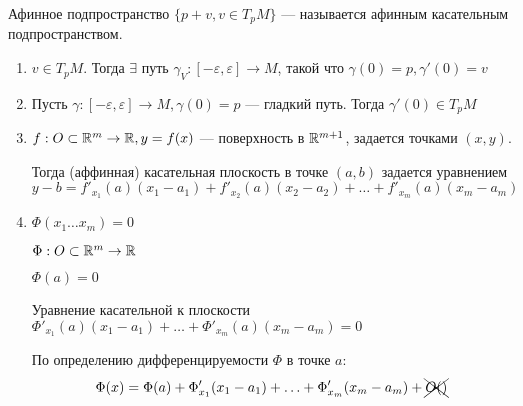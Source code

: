 \begin{example}
    Афинное подпространство $\{p + v, v\in T_pM\}$ --- называется афинным касательным подпространством.
\end{example}

\begin{remark}\itemfix
    \begin{enumerate}
        \item $v\in T_pM$. Тогда $\exists$ путь $\gamma_V : [-\varepsilon, \varepsilon] \to M$, такой что $\gamma(0)=p, \gamma'(0)=v$
        \item Пусть $\gamma : [-\varepsilon, \varepsilon]\to M, \gamma(0) = p$ --- гладкий путь. Тогда $\gamma'(0) \in T_pM$
        \item $f : O\subset\mathbb{R}^m \to\mathbb{R}, y=f(x)$ --- поверхность в $\mathbb{R}^{m+1}$, задается точками $(x, y)$.

              Тогда (аффинная) касательная плоскость в точке $(a, b)$ задается уравнением
              $$y-b = f'_{x_1}(a)(x_1-a_1) + f'_{x_2}(a)(x_2-a_2) + \ldots + f'_{x_m}(a)(x_m-a_m)$$
        \item $\Phi(x_1\ldots x_m) = 0$

              $\Phi : O\subset\mathbb{R}^m \to\mathbb{R}$

              $\Phi(a) = 0$

              Уравнение касательной к плоскости $\Phi'_{x_1}(a)(x_1-a_1) + \ldots + \Phi'_{x_m}(a)(x_m-a_m) = 0$


              По определению дифференцируемости $\Phi$ в точке $a$:
              $$\Phi(x) = \Phi(a) + \Phi'_{x_1}(x_1-a_1) + \ldots + \Phi'_{x_m}(x_m-a_m) + \xcancel{O()}$$

              \?
    \end{enumerate}
\end{remark}
